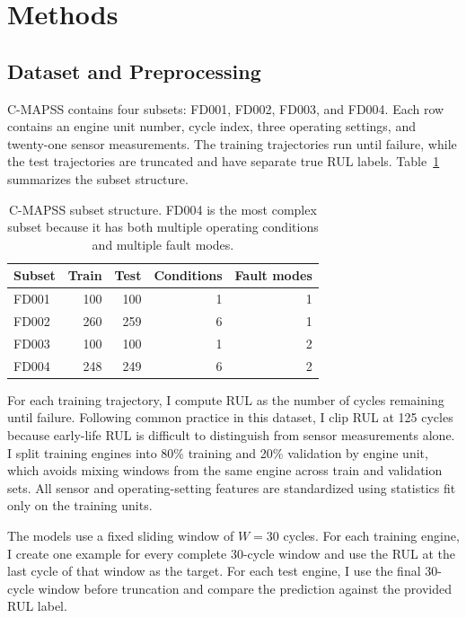 \documentclass[10pt]{article}
\begin{document}
\section{Methods}

\subsection{Dataset and Preprocessing}

C-MAPSS contains four subsets: FD001, FD002, FD003, and FD004. Each row contains an engine unit number, cycle index, three operating settings, and twenty-one sensor measurements. The training trajectories run until failure, while the test trajectories are truncated and have separate true RUL labels. Table~\ref{tab:subsets} summarizes the subset structure.

\begin{table}[h]
\centering
\caption{C-MAPSS subset structure. FD004 is the most complex subset because it has both multiple operating conditions and multiple fault modes.}
\label{tab:subsets}
\begin{tabular}{lrrrr}
\toprule
Subset & Train & Test & Conditions & Fault modes \\
\midrule
FD001 & 100 & 100 & 1 & 1 \\
FD002 & 260 & 259 & 6 & 1 \\
FD003 & 100 & 100 & 1 & 2 \\
FD004 & 248 & 249 & 6 & 2 \\
\bottomrule
\end{tabular}
\end{table}

For each training trajectory, I compute RUL as the number of cycles remaining until failure. Following common practice in this dataset, I clip RUL at 125 cycles because early-life RUL is difficult to distinguish from sensor measurements alone. I split training engines into 80\% training and 20\% validation by engine unit, which avoids mixing windows from the same engine across train and validation sets. All sensor and operating-setting features are standardized using statistics fit only on the training units.

The models use a fixed sliding window of $W=30$ cycles. For each training engine, I create one example for every complete 30-cycle window and use the RUL at the last cycle of that window as the target. For each test engine, I use the final 30-cycle window before truncation and compare the prediction against the provided RUL label.
\end{document}
